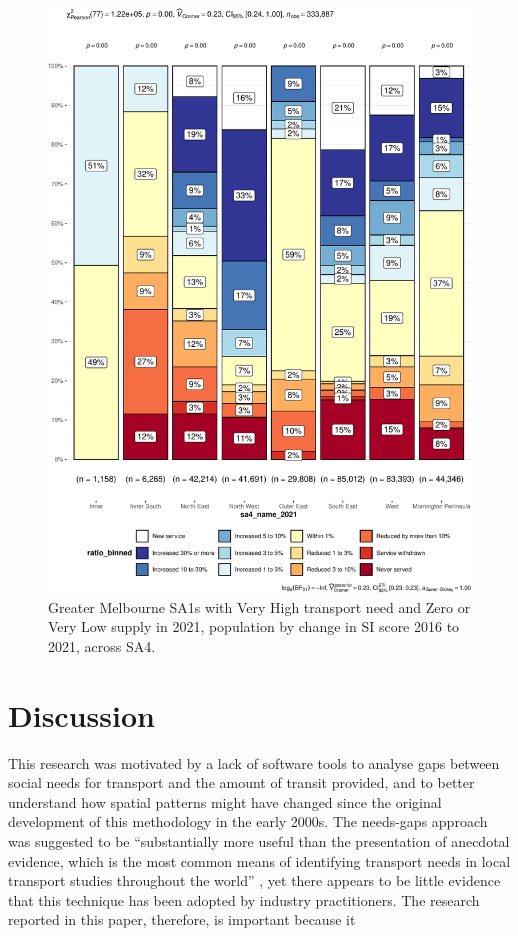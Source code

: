 \documentclass[preprint, 3p,
authoryear]{elsarticle} %
\begin{document}
\begin{figure}
\centering
\includegraphics{Leveraging_GTFS_to_assess_transit_supply_Transport_Geography_files/figure-latex/Greater_Melbourne_2021_needs_gap_SA4_service_change-1.pdf}
\caption{Greater Melbourne SA1s with Very High transport need and Zero
or Very Low supply in 2021, population by change in SI score 2016 to
2021, across SA4.}
\end{figure}

\section{Discussion}\label{discussion}

This research was motivated by a lack of software tools to analyse gaps
between social needs for transport and the amount of transit provided,
and to better understand how spatial patterns might have changed since
the original development of this methodology in the early 2000s. The
needs-gaps approach was suggested to be ``substantially more useful than
the presentation of anecdotal evidence, which is the most common means
of identifying transport needs in local transport studies throughout the
world'' \citep{currie2010identifying}, yet there appears to be little
evidence that this technique has been adopted by industry practitioners.
The research reported in this paper, therefore, is important because it
\end{document}
